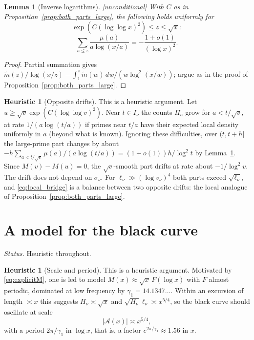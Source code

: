 \documentclass[11pt]{amsart}
\numberwithin{equation}{section}
\theoremstyle{plain}
\newtheorem{lemma}[theorem]{Lemma}
\theoremstyle{definition}
\newtheorem{heuristic}[theorem]{Heuristic}
\theoremstyle{remark}
\newcommand{\Anet}{\mathcal{A}}
\newcommand{\mt}{\widetilde{m}}
\begin{document}
\begin{lemma}[Inverse logarithms]
\label{lem:inverse_log_sum}
\emph{[unconditional]} With $C$ as in
Proposition~\ref{prop:both_parts_large}, the following holds uniformly for
\[
\exp(C(\log\log x)^2)\le z\le\sqrt x:
\]
\begin{equation}
\label{eq:inverse_log_sum}
  \sum_{a\le z}\frac{\mu(a)}{a\log(x/a)}=-\frac{1+o(1)}{(\log x)^2}.
\end{equation}
\end{lemma}

\begin{proof}
Partial summation gives
$\mt(z)/\log(x/z)-\int_1^z\mt(w)\,dw/(w\log^2(x/w))$; argue as in the proof
of Proposition~\ref{prop:both_parts_large}.
\end{proof}

\begin{heuristic}[Opposite drifts]
\label{heu:local_drift}
This is a heuristic argument. Let $u\ge\sqrt v\exp(C(\log\log v)^2)$. Near
$t\in I_\nu$ the counts $\Pi_a$ grow for $a<t/\sqrt v$, at rate
$1/(a\log(t/a))$ if primes near $t/a$ have their expected local density
uniformly in $a$ (beyond what is known). Ignoring these difficulties, over
$(t,t+h]$ the large-prime part changes by about
$-h\sum_{a<t/\sqrt v}\mu(a)/(a\log(t/a))=(1+o(1))h/\log^2t$ by
Lemma~\ref{lem:inverse_log_sum}. Since $M(v)-M(u)=0$, the
$\sqrt v$-smooth part drifts at rate about $-1/\log^2v$. The drift does not
depend on $\sigma_\nu$. For $\ell_\nu\gg(\log v_\nu)^4$ both parts exceed
$\sqrt{\ell_\nu}$, and \eqref{eq:local_bridge} is a balance between two
opposite drifts: the local analogue of
Proposition~\ref{prop:both_parts_large}.
\end{heuristic}

\section{A model for the black curve}
\label{sec:model}

\noindent\emph{Status.} Heuristic throughout.

\begin{heuristic}[Scale and period]
\label{heu:model}
This is a heuristic argument. Motivated by \eqref{eq:explicitM}, one is led
to model $M(x)\approx\sqrt x\,F(\log x)$ with $F$ almost periodic, dominated
at low frequency by $\gamma_1=14.1347\ldots$. Within an excursion of length
$\asymp x$ this suggests $H_\nu\asymp\sqrt x$ and
$\sqrt{H_\nu}\ell_\nu\asymp x^{5/4}$, so the black curve should oscillate at
scale
\begin{equation}
\label{eq:model_scale}
  |\Anet(x)|\asymp x^{5/4},
\end{equation}
with a period $2\pi/\gamma_1$ in $\log x$, that is, a factor
$e^{2\pi/\gamma_1}\approx1.56$ in $x$.
\end{heuristic}
\end{document}
